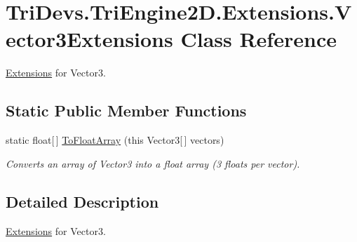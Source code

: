 \hypertarget{class_tri_devs_1_1_tri_engine2_d_1_1_extensions_1_1_vector3_extensions}{\section{Tri\-Devs.\-Tri\-Engine2\-D.\-Extensions.\-Vector3\-Extensions Class Reference}
\label{class_tri_devs_1_1_tri_engine2_d_1_1_extensions_1_1_vector3_extensions}
}


\hyperlink{namespace_tri_devs_1_1_tri_engine2_d_1_1_extensions}{Extensions} for Vector3.  


\subsection*{Static Public Member Functions}
\begin{DoxyCompactItemize}
\item 
static float\mbox{[}$\,$\mbox{]} \hyperlink{class_tri_devs_1_1_tri_engine2_d_1_1_extensions_1_1_vector3_extensions_af175669e040ebf390b8128a21b552e49}{To\-Float\-Array} (this Vector3\mbox{[}$\,$\mbox{]} vectors)
\begin{DoxyCompactList}\small\item\em Converts an array of Vector3 into a float array (3 floats per vector). \end{DoxyCompactList}\end{DoxyCompactItemize}


\subsection{Detailed Description}
\hyperlink{namespace_tri_devs_1_1_tri_engine2_d_1_1_extensions}{Extensions} for Vector3. 



